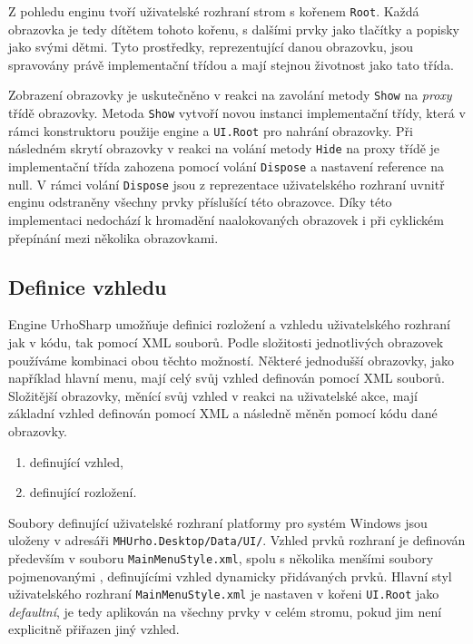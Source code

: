 Z pohledu enginu tvoří uživatelské rozhraní strom s kořenem \texttt{Root}. Každá obrazovka je tedy dítětem tohoto kořenu, s dalšími prvky jako tlačítky a popisky jako svými dětmi. Tyto prostředky, reprezentující danou obrazovku, jsou spravovány právě implementační třídou a mají stejnou životnost jako tato třída.

Zobrazení obrazovky je uskutečněno v reakci na zavolání metody \texttt{Show} na \textit{proxy} třídě obrazovky. Metoda \texttt{Show} vytvoří novou instanci implementační třídy, která v rámci konstruktoru použije engine a \texttt{UI.Root} pro nahrání obrazovky. Při následném skrytí obrazovky v reakci na volání metody \texttt{Hide} na proxy třídě je implementační třída zahozena pomocí volání \texttt{Dispose} a nastavení reference na null. V rámci volání \texttt{Dispose} jsou z reprezentace uživatelského rozhraní uvnitř enginu odstraněny všechny prvky příslušící této obrazovce. Díky této implementaci nedochází k hromadění naalokovaných obrazovek i při cyklickém přepínání mezi několika obrazovkami.



\subsection{Definice vzhledu}
Engine UrhoSharp umožňuje definici rozložení a vzhledu uživatelského rozhraní jak v kódu, tak pomocí XML souborů. Podle složitosti jednotlivých obrazovek používáme kombinaci obou těchto možností. Některé jednodušší obrazovky, jako například hlavní menu, mají celý svůj vzhled definován pomocí XML souborů. Složitější obrazovky, měnící svůj vzhled v reakci na uživatelské akce, mají základní vzhled definován pomocí XML a následně měněn pomocí kódu dané obrazovky. 

\begin{enumerate}
	\item definující vzhled,
	\item definující rozložení.
\end{enumerate}

Soubory definující uživatelské rozhraní platformy pro systém Windows jsou uloženy v adresáři \texttt{MHUrho.Desktop/Data/UI/}.
Vzhled prvků rozhraní je definován především v souboru \texttt{MainMenuStyle.xml}, spolu s několika menšími soubory pojmenovanými , definujícími vzhled dynamicky přidávaných prvků. Hlavní styl uživatelského rozhraní \texttt{MainMenuStyle.xml} je nastaven v kořeni \texttt{UI.Root} jako \textit{defaultní}, je tedy aplikován na všechny prvky v celém stromu, pokud jim není explicitně přiřazen jiný vzhled.


